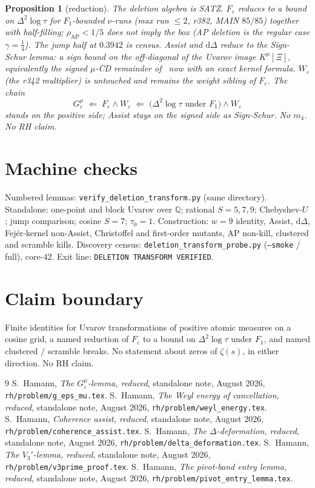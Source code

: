 \documentclass[11pt]{article}
\newtheorem{prop}{Proposition}
\theoremstyle{remark}
\newcommand{\Q}{\mathbb{Q}}
\newcommand{\eps}{\varepsilon}
\begin{document}
\begin{prop}[reduction]\label{prop:red}
The deletion algebra is SATZ.
$F_\eps$ reduces to a bound on $\Delta^2\log\tau$ for
$F_1$-bounded $\nu$-runs (max run $\le 2$, r382, MAIN $85/85$)
together with half-filling; $\rho_{\mathrm{AP}}<1/5$ does not
imply the box (AP deletion is the regular case $\gamma=\tfrac14$).
The jump half at $0.3942$ is census.
Assist and $\mathrm{d}\Delta$ reduce to the \emph{Sign-Schur}
lemma: a sign bound on the off-diagonal of the Uvarov image
$K^\mu[\Xi]$, equivalently the signed $\mu$-CD remainder of~\cite{r387}
now with an exact kernel formula.
$W_\eps$ (the r342 multiplier) is untouched and remains the
weight sibling of $F_\eps$.
The chain
\[
G_\varepsilon^\mu
\;\Longleftarrow\;
F_\eps\wedge W_\eps
\;\Longleftarrow\;
\bigl(\Delta^2\log\tau\text{ under }F_1\bigr)
\wedge W_\eps
\]
stands on the positive side;
Assist stays on the signed side as Sign-Schur.
No $m_4$.  No RH claim.
\end{prop}

\section{Machine checks}\label{sec:machine}

Numbered lemmas: \texttt{verify\_deletion\_transform.py} (same
directory).
Standalone: one-point and block Uvarov over $\Q$; rational
$S=5,7,9$; Chebyshev-$U$; jump comparison; cosine $S=7$;
$\tau_0=1$.
Construction: $w=9$ identity, Assist, $\mathrm{d}\Delta$,
Fej\'er-kernel non-Assist, Christoffel and first-order mutants,
AP non-kill, clustered and scramble kills.
Discovery census: \texttt{deletion\_transform\_probe.py}
(\texttt{--smoke} / full), core-$42$.
Exit line: \texttt{DELETION TRANSFORM VERIFIED}.

\section*{Claim boundary}

Finite identities for Uvarov transformations of positive atomic
measures on a cosine grid, a named reduction of $F_\eps$ to a
bound on $\Delta^2\log\tau$ under $F_1$, and named clustered /
scramble breaks.
No statement about zeros of $\zeta(s)$, in either direction.
No RH claim.

\begin{thebibliography}{9}
S.~Hamann,
\textit{The $G_\varepsilon^\mu$-lemma, reduced},
standalone note, August 2026,
\texttt{rh/problem/g\_eps\_mu.tex}.
S.~Hamann,
\textit{The Weyl energy of cancellation, reduced},
standalone note, August 2026,
\texttt{rh/problem/weyl\_energy.tex}.
S.~Hamann,
\textit{Coherence assist, reduced},
standalone note, August 2026,
\texttt{rh/problem/coherence\_assist.tex}.
S.~Hamann,
\textit{The $\Delta$-deformation, reduced},
standalone note, August 2026,
\texttt{rh/problem/delta\_deformation.tex}.
S.~Hamann,
\textit{The $V_3'$-lemma, reduced},
standalone note, August 2026,
\texttt{rh/problem/v3prime\_proof.tex}.
S.~Hamann,
\textit{The pivot-band entry lemma, reduced},
standalone note, August 2026,
\texttt{rh/problem/pivot\_entry\_lemma.tex}.
\end{thebibliography}
\end{document}
